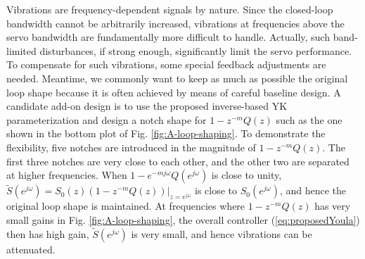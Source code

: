 \documentclass [11pt, proquest] {uwthesis}[2020/02/24]
\begin{document}
\label{subsec:NarrowBand_loopShaping}Vibrations are frequency-dependent
signals by nature. Since the closed-loop bandwidth cannot be arbitrarily
increased, vibrations at frequencies above the servo bandwidth are
fundamentally more difficult to handle. Actually, such band-limited
disturbances, if strong enough, significantly limit the servo performance.
To compensate for such vibrations, some special feedback adjustments
are needed. Meantime, we commonly want to keep as much as possible
the original loop shape because it is often achieved by means of careful
baseline design. A candidate add-on design is to use the proposed
inverse-based YK parameterization and design a notch shape for $1-z^{-m}Q(z)$
such as the one shown in the bottom plot of Fig. \ref{fig:A-loop-shaping}.
To demonstrate the flexibility, five notches are introduced in the
magnitude of $1-z^{-m}Q(z)$. The first three notches are very close
to each other, and the other two are separated at higher frequencies.
When $1-e^{-mj\omega}Q(e^{j\omega})$ is close to unity, $\tilde{S}(e^{j\omega})=\left.S_{0}(z)(1-z^{-m}Q(z))\right|_{z=e^{j\omega}}$
is close to $S_{0}(e^{j\omega})$, and hence the original loop shape
is maintained. At frequencies where $1-z^{-m}Q(z)$ has very small
gains in Fig. \ref{fig:A-loop-shaping}, the overall controller (\ref{eq:proposedYoula})
then has high gain, $\tilde{S}(e^{j\omega})$ is very small, and hence
vibrations can be attenuated.
\end{document}
